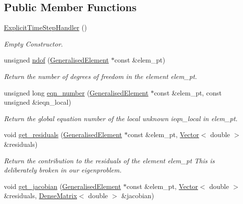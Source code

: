 \subsection*{Public Member Functions}
\begin{DoxyCompactItemize}
\item 
\hyperlink{classoomph_1_1ExplicitTimeStepHandler_a8519d4a06eeeb23280daa29f72f93318}{Explicit\+Time\+Step\+Handler} ()
\begin{DoxyCompactList}\small\item\em Empty Constructor. \end{DoxyCompactList}\item 
unsigned \hyperlink{classoomph_1_1ExplicitTimeStepHandler_a723bec764e9e59025f052f6ca0135181}{ndof} (\hyperlink{classoomph_1_1GeneralisedElement}{Generalised\+Element} $\ast$const \&elem\+\_\+pt)
\begin{DoxyCompactList}\small\item\em Return the number of degrees of freedom in the element elem\+\_\+pt. \end{DoxyCompactList}\item 
unsigned long \hyperlink{classoomph_1_1ExplicitTimeStepHandler_a491d39988264739332c3e9c7dbb38344}{eqn\+\_\+number} (\hyperlink{classoomph_1_1GeneralisedElement}{Generalised\+Element} $\ast$const \&elem\+\_\+pt, const unsigned \&ieqn\+\_\+local)
\begin{DoxyCompactList}\small\item\em Return the global equation number of the local unknown ieqn\+\_\+local in elem\+\_\+pt. \end{DoxyCompactList}\item 
void \hyperlink{classoomph_1_1ExplicitTimeStepHandler_aef8ab1b61aef072b2bcb061dd287a00f}{get\+\_\+residuals} (\hyperlink{classoomph_1_1GeneralisedElement}{Generalised\+Element} $\ast$const \&elem\+\_\+pt, \hyperlink{classoomph_1_1Vector}{Vector}$<$ double $>$ \&residuals)
\begin{DoxyCompactList}\small\item\em Return the contribution to the residuals of the element elem\+\_\+pt This is deliberately broken in our eigenproblem. \end{DoxyCompactList}\item 
void \hyperlink{classoomph_1_1ExplicitTimeStepHandler_ad2c849833e4b35199a79d9d9965af32f}{get\+\_\+jacobian} (\hyperlink{classoomph_1_1GeneralisedElement}{Generalised\+Element} $\ast$const \&elem\+\_\+pt, \hyperlink{classoomph_1_1Vector}{Vector}$<$ double $>$ \&residuals, \hyperlink{classoomph_1_1DenseMatrix}{Dense\+Matrix}$<$ double $>$ \&jacobian)

\end{DoxyCompactItemize}
